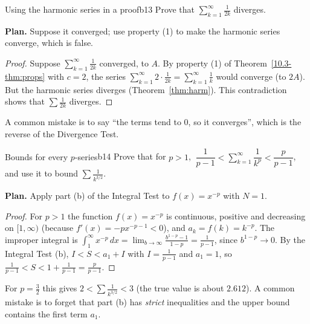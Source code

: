 \documentclass[11pt]{article}
\begin{document}
\begin{exmp}{Using the harmonic series in a proof}{b13}
Prove that $\displaystyle\sum_{k=1}^\infty\frac1{2k}$ diverges.

\textbf{Plan.} Suppose it converged; use property (1) to make the harmonic series converge, which is false.

\begin{proof}
Suppose $\sum_{k=1}^\infty\frac1{2k}$ converged, to $A$. By property (1) of Theorem~\ref{10.3-thm:props} with $c=2$, the series $\sum_{k=1}^\infty2\cdot\frac1{2k}=\sum_{k=1}^\infty\frac1k$ would converge (to $2A$). But the harmonic series diverges (Theorem~\ref{thm:harm}). This contradiction shows that $\sum\frac1{2k}$ diverges.
\end{proof}
A common mistake is to say ``the terms tend to $0$, so it converges'', which is the reverse of the Divergence Test.
\end{exmp}

\begin{exmp}{Bounds for every $p$-series}{b14}
Prove that for $p>1$, $\ \dfrac1{p-1}<\displaystyle\sum_{k=1}^\infty\dfrac1{k^p}<\dfrac p{p-1}$, and use it to bound $\sum\frac1{k^{3/2}}$.

\textbf{Plan.} Apply part (b) of the Integral Test to $f(x)=x^{-p}$ with $N=1$.

\begin{proof}
For $p>1$ the function $f(x)=x^{-p}$ is continuous, positive and decreasing on $[1,\infty)$ (because $f'(x)=-px^{-p-1}<0$), and $a_k=f(k)=k^{-p}$. The improper integral is $\int_1^\infty x^{-p}\,dx=\lim_{b\to\infty}\frac{b^{1-p}-1}{1-p}=\frac1{p-1}$, since $b^{1-p}\to0$. By the Integral Test (b), $I<S<a_1+I$ with $I=\frac1{p-1}$ and $a_1=1$, so $\frac1{p-1}<S<1+\frac1{p-1}=\frac p{p-1}$.
\end{proof}
For $p=\frac32$ this gives $2<\sum\frac1{k^{3/2}}<3$ (the true value is about $2.612$). A common mistake is to forget that part (b) has \emph{strict} inequalities and the upper bound contains the first term $a_1$.
\end{exmp}
\end{document}
